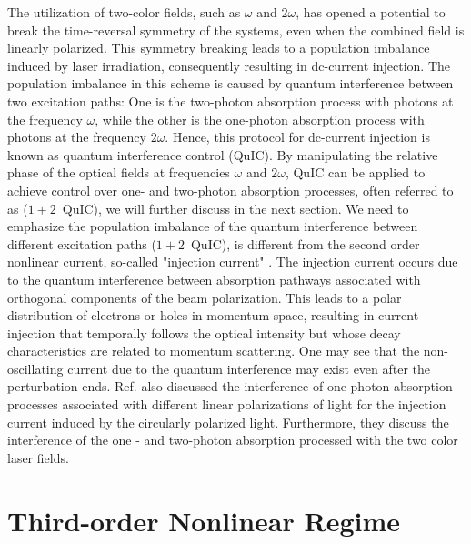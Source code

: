 The utilization of two-color fields, such as  $\omega$ and  $2\omega$, has opened a potential to
break the time-reversal symmetry of the systems, even when the combined field is linearly
polarized. This symmetry breaking leads to a population imbalance induced by laser irradiation,
consequently resulting in dc-current injection. The population imbalance in this scheme is caused
by quantum interference between two excitation paths: One is the two-photon absorption process with
photons at the frequency  $\omega$, while the other is the one-photon absorption process with
photons at the frequency  $2\omega$. Hence, this protocol for dc-current injection is known as
quantum interference control (\gls{QuIC}). By manipulating the relative phase of the optical fields
at frequencies  $\omega$ and $2\omega$, \gls{QuIC} can be applied to achieve control over one- and
two-photon absorption processes, often referred to as ($1+2$~QuIC), we will further discuss in the
next section.
\color{red}
We need to emphasize the population imbalance of the quantum interference between different excitation paths ($1+2$~QuIC), is different from the second order nonlinear current, so-called "injection current" \cite{laman2005ultrafast}. The injection current occurs due to the quantum interference between absorption pathways associated with orthogonal components of the beam polarization. This leads to a polar distribution of electrons or holes in momentum space, resulting in current injection that temporally follows the optical intensity but whose decay characteristics are related to momentum scattering\cite{laman2005ultrafast}. One may see that the non-oscillating current due to the quantum interference may exist even after the perturbation ends. Ref.\cite{sipe2000second} also discussed the interference of one-photon absorption processes associated with different linear polarizations of light for the injection current induced by the circularly polarized light. Furthermore,  they discuss the interference of the one - and two-photon absorption processed with the two color laser fields.\\
\color{black}
\section{Third-order Nonlinear Regime \label{sec:perturbative}}

